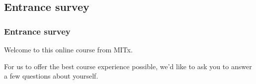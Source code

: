 \documentclass[pdftex, brazil, 12pt, twoside]{article}
\begin{document}
\begin{figure}[H]
  \begin{center}
    \label{fig:syllabus6}
  \end{center}
\end{figure}

\begin{figure}[H]
  \begin{center}
    \label{fig:syllabus7}
  \end{center}
\end{figure}


\subsection{Entrance survey}
\label{gs-survey}

\subsubsection{Entrance survey}
\label{gs-survey-survey}

Welcome to this online course from MITx.

For us to offer the best course experience possible, we'd like to ask you to answer a few questions about yourself.
\end{document}
